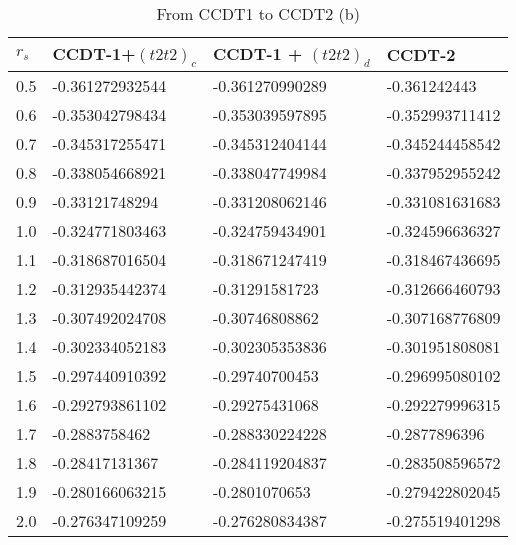 \begin{table}[hbtp]
\caption{From CCDT1 to CCDT2 (b)}
\begin{center}
\begin{threeparttable}
\begin{tabular}{l l l l}
    \toprule
$r_s$ & CCDT-1+$(t2t2)_c$ & CCDT-1 + $(t2t2)_d$ & CCDT-2  \\ \hline
0.5 & -0.361272932544 & -0.361270990289 & -0.361242443   \\
0.6 & -0.353042798434 & -0.353039597895 & -0.352993711412   \\
0.7 & -0.345317255471 & -0.345312404144 & -0.345244458542   \\
0.8 & -0.338054668921 & -0.338047749984 & -0.337952955242   \\
0.9 & -0.33121748294 & -0.331208062146 & -0.331081631683   \\
1.0 & -0.324771803463 & -0.324759434901 & -0.324596636327   \\
1.1 & -0.318687016504 & -0.318671247419 & -0.318467436695   \\
1.2 & -0.312935442374 & -0.31291581723 & -0.312666460793   \\
1.3 & -0.307492024708 & -0.30746808862 & -0.307168776809   \\
1.4 & -0.302334052183 & -0.302305353836 & -0.301951808081   \\
1.5 & -0.297440910392 & -0.29740700453 & -0.296995080102   \\
1.6 & -0.292793861102 & -0.29275431068 & -0.292279996315   \\
1.7 & -0.2883758462 & -0.288330224228 & -0.2877896396   \\
1.8 & -0.28417131367 & -0.284119204837 & -0.283508596572   \\
1.9 & -0.280166063215 & -0.2801070653 & -0.279422802045   \\
2.0 & -0.276347109259 & -0.276280834387 & -0.275519401298   \\
\bottomrule
\end{tabular}
\begin{tablenotes}
\end{tablenotes}
\end{threeparttable}
\end{center}
\label{tab:ccd1_to_ccdt2_2}
\end{table}


